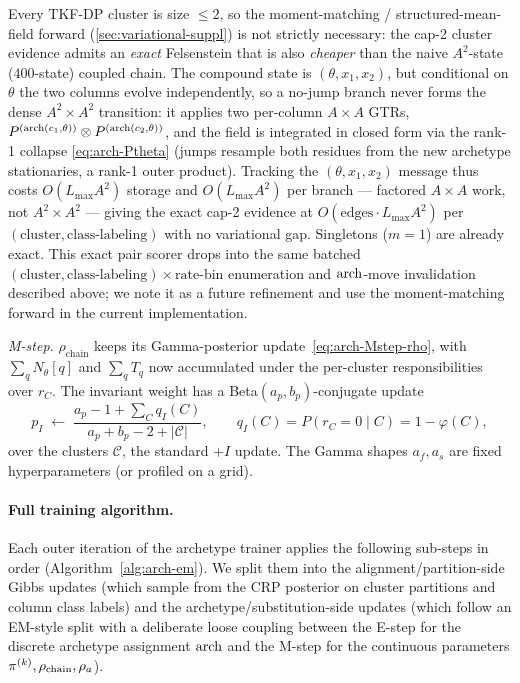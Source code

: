 \begin{remark}
\label{rmk:exact-cap2}
Every TKF-DP cluster is size $\le 2$, so the moment-matching /
structured-mean-field forward (\autoref{sec:variational-suppl}) is not
strictly necessary: the cap-2 cluster evidence admits an \emph{exact}
Felsenstein that is also \emph{cheaper} than the naive $A^2$-state
($400$-state) coupled chain. The compound state is $(\theta, x_1, x_2)$,
but conditional on $\theta$ the two columns evolve independently, so a
no-jump branch never forms the dense $A^2 \times A^2$ transition: it
applies two per-column $A\times A$ GTRs, $P^{(\mathrm{arch}(c_1,\theta))} \otimes
P^{(\mathrm{arch}(c_2,\theta))}$, and the field is integrated in closed form via
the rank-1 collapse \eqref{eq:arch-Ptheta} (jumps resample both residues
from the new archetype stationaries, a rank-1 outer product). Tracking
the $(\theta, x_1, x_2)$ message thus costs $O(L_{\max} A^2)$ storage and
$O(L_{\max} A^2)$ per branch --- factored $A\times A$ work, not
$A^2\times A^2$ --- giving the exact cap-2 evidence at
$O(\text{edges}\cdot L_{\max} A^2)$ per $(\text{cluster},
\text{class-labeling})$ with no variational gap. Singletons ($m=1$) are
already exact. This exact pair scorer drops into the same batched
$(\text{cluster}, \text{class-labeling})\times\text{rate-bin}$ enumeration
and $\mathrm{arch}$-move invalidation described above; we note it as a future
refinement and use the moment-matching forward in the current
implementation.
\end{remark}

\emph{M-step.} $\rho_{\text{chain}}$ keeps its Gamma-posterior
update~\eqref{eq:arch-Mstep-rho}, with $\sum_q N_\theta[q]$ and
$\sum_q T_q$ now accumulated under the per-cluster responsibilities over
$r_C$. The invariant weight has a Beta$(a_p, b_p)$-conjugate update
\begin{equation}
  p_I \;\leftarrow\; \frac{a_p - 1 + \sum_C q_I(C)}{a_p + b_p - 2 + |\mathcal{C}|},
  \qquad q_I(C) = P(r_C = 0 \mid C) = 1 - \varphi(C),
  \label{eq:pinv-mstep}
\end{equation}
over the clusters $\mathcal{C}$, the standard $+I$ update. The Gamma
shapes $a_f, a_s$ are fixed hyperparameters (or profiled on a grid).

\paragraph{Full training algorithm.}
\label{par:arch-algorithm}
Each outer iteration of the archetype trainer applies the following
sub-steps in order (Algorithm~\ref{alg:arch-em}). We split them into
the alignment/partition-side Gibbs updates (which sample from the CRP
posterior on cluster partitions and column class labels) and the
archetype/substitution-side updates (which follow an EM-style split with
a deliberate loose coupling between the E-step for the discrete
archetype assignment $\mathrm{arch}$ and the M-step for the continuous
parameters $\pi^{(k)}, \rho_{\text{chain}}, \rho_a$).

